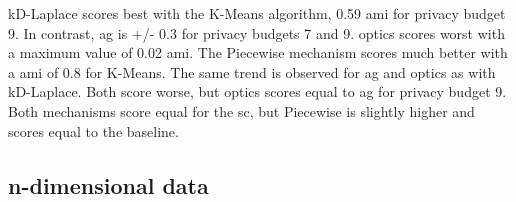 \begin{figure}[H]
\begin{subfigure}{1\textwidth}
      \end{subfigure}
      \label{fig:validation-skewed-dataset_comparison_3d-laplace}
\end{figure}
kD-Laplace scores best with the K-Means algorithm, 0.59 \gls{ami} for privacy budget 9.
In contrast, \gls{ag} is +/- 0.3 for privacy budgets 7 and 9. \gls{optics} scores worst with a maximum value of 0.02 \gls{ami}.
The Piecewise mechanism scores much better with a \gls{ami} of 0.8 for K-Means. The same trend is observed for \gls{ag} and \gls{optics} as with kD-Laplace.
Both score worse, but \gls{optics} scores equal to \gls{ag} for privacy budget 9.
Both mechanisms score equal for the \gls{sc}, but Piecewise is slightly higher and scores equal to the baseline.
\newpage
\subsection{n-dimensional data}

